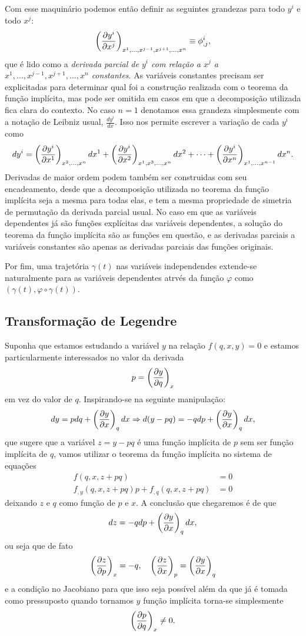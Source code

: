 \documentclass[a4paper, 12pt]{article}
\newcommand{\pd}[3]{
    \ifblank{#3}{}{\left(}
    \frac{\partial #1}{\partial #2}
    \ifblank{#3}{}{\right)_{#3}}
}
\theoremstyle{definition}
\theoremstyle{definition}
\begin{document}
Com esse maquinário podemos então definir as seguintes grandezas para todo $y^i$ e todo $x^j$:
$$\pd{y^i}{x^j}{x^1,\dots,x^{j-1},x^{j+1},\dots,x^n}\equiv\phi^i_{,j},$$
que é lido como a \textit{derivada parcial de $y^i$ com relação a $x^j$ a $x^1,\dots,x^{j-1},x^{j+1}
,\dots,x^n$ constantes}. As variáveis constantes precisam ser explicitadas para determinar
qual foi a construção realizada com o teorema da função implícita, mas pode ser omitida em casos
em que a decomposição utilizada fica clara do contexto. No caso $n=1$ denotamos essa grandeza simplesmente 
com a notação de Leibniz usual, $\frac{dy^i}{dx}$. Isso nos permite escrever a variação de cada $y^i$ como
$$dy^i=\pd{y^i}{x^1}{x^2,\dots,x^n}dx^1+\pd{y^i}{x^2}{x^1,x^3,\dots,x^n}dx^2+\cdots+\pd{y^i}{x^n}{x^1,\dots,x^{n-1}}dx^n.$$
Derivadas de maior ordem podem também ser construidas com seu encadeamento, desde que a decomposição utilizada
no teorema da função implícita seja a mesma para todas elas, e tem a mesma propriedade de simetria de permutação 
da derivada parcial usual. No caso em que as variáveis dependentes já são funções explícitas das variáveis
dependentes, a solução do teorema da função implícita são as funções em questão, e as derivadas parciais
a variáveis constantes são apenas as derivadas parciais das funções originais.

Por fim, uma trajetória $\gamma(t)$ nas variáveis independendes extende-se naturalmente para as variáveis
dependentes atrvés da função $\varphi$ como $(\gamma(t), \varphi\circ\gamma(t))$.

\subsection{Transformação de Legendre}

Suponha que estamos estudando a variável $y$ na relação $f(q,x,y)=0$ e estamos particularmente interessados
no valor da derivada 
$$p=\pd{y}{q}{x}$$
em vez do valor de $q$. Inspirando-se na seguinte manipulação:
$$dy=pdq+\pd{y}{x}{q}dx\Rightarrow
d(y-pq)=-qdp+\pd{y}{x}{q}dx,$$
que sugere que a variável $z=y-pq$ é uma função implícita de $p$ sem ser função implícita de $q$, vamos
utilizar o teorema da função implícita no sistema de equações
\begin{align*}
    f(q,x,z+pq)&=0\\
    f_{,y}(q,x,z+pq)p+f_{,q}(q,x,z+pq)&=0
\end{align*}
deixando $z$ e $q$ como função de $p$ e $x$. A conclusão que chegaremos é de que
$$dz=-qdp+\pd{y}{x}{q}dx,$$
ou seja que de fato
$$\pd{z}{p}{x}=-q,\quad\pd{z}{x}{p}=\pd{y}{x}{q}$$
e a condição no Jacobiano para que isso seja possível além da que já é tomada como pressuposto quando
tornamos $y$ função implícita torna-se simplesmente
$$\pd{p}{q}{x}\neq0.$$
\end{document}
